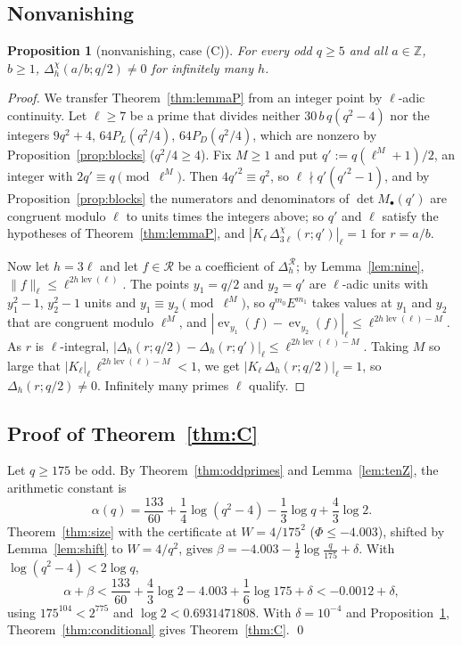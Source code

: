 \documentclass[11pt]{amsart}
\newtheorem{proposition}[theorem]{Proposition}
\theoremstyle{definition}
\theoremstyle{remark}
\numberwithin{equation}{section}
\newcommand{\ZZ}{\mathbb{Z}}
\newcommand{\cR}{\mathcal{R}}
\newcommand{\lev}{\operatorname{lev}}
\newcommand{\ev}{\operatorname{ev}}
\begin{document}
\subsection{Nonvanishing}

\begin{proposition}[nonvanishing, case (C)]\label{prop:nonvanC}
For every odd $q\ge5$ and all $a\in\ZZ$, $b\ge1$, $\Delta^\chi_h(a/b;q/2)\ne0$ for infinitely many $h$.
\end{proposition}

\begin{proof}
We transfer Theorem~\ref{thm:lemmaP} from an integer point by $\ell$-adic continuity. Let $\ell\ge7$ be a prime that divides
neither $30\,b\,q(q^2-4)$ nor the integers $9q^2+4$, $64P_L(q^2/4)$, $64P_D(q^2/4)$, which are nonzero by
Proposition~\ref{prop:blocks} ($q^2/4\ge4$). Fix $M\ge1$ and put $q':=q(\ell^M+1)/2$, an integer with $2q'\equiv q\pmod{\ell^M}$.
Then $4q'^2\equiv q^2$, so $\ell\nmid q'(q'^2-1)$, and by Proposition~\ref{prop:blocks} the numerators and denominators of
$\det M_\bullet(q')$ are congruent modulo $\ell$ to units times the integers above; so $q'$ and $\ell$ satisfy the
hypotheses of Theorem~\ref{thm:lemmaP}, and $|K_\ell\,\Delta^\chi_{3\ell}(r;q')|_\ell=1$ for $r=a/b$.

Now let $h=3\ell$ and let $f\in\cR$ be a coefficient of $\Delta^{\cR}_h$; by Lemma~\ref{lem:nine}, $\|f\|_\ell\le\ell^{2h\lev(\ell)}$.
The points $y_1=q/2$ and $y_2=q'$ are $\ell$-adic units with $y_1^2-1$, $y_2^2-1$ units and $y_1\equiv y_2\pmod{\ell^M}$,
so $q^{m_0}E^{m_1}$ takes values at $y_1$ and $y_2$ that are congruent modulo $\ell^M$, and
$|\ev_{y_1}(f)-\ev_{y_2}(f)|_\ell\le\ell^{2h\lev(\ell)-M}$. As $r$ is $\ell$-integral,
$|\Delta_h(r;q/2)-\Delta_h(r;q')|_\ell\le\ell^{2h\lev(\ell)-M}$. Taking $M$ so large that $|K_\ell|_\ell\,\ell^{2h\lev(\ell)-M}<1$,
we get $|K_\ell\,\Delta_h(r;q/2)|_\ell=1$, so $\Delta_h(r;q/2)\ne0$. Infinitely many primes $\ell$ qualify.
\end{proof}

\subsection{Proof of Theorem~\ref{thm:C}}
Let $q\ge175$ be odd. By Theorem~\ref{thm:oddprimes} and Lemma~\ref{lem:tenZ}, the arithmetic constant is
\[
  \alpha(q)=\frac{133}{60}+\frac14\log(q^2-4)-\frac13\log q+\frac43\log2 .
\]
Theorem~\ref{thm:size} with the certificate at $W=4/175^2$ ($\Phi\le-4.003$), shifted by Lemma~\ref{lem:shift} to $W=4/q^2$,
gives $\beta=-4.003-\frac12\log\frac q{175}+\delta$. With $\log(q^2-4)<2\log q$,
\[
  \alpha+\beta<\frac{133}{60}+\frac43\log2-4.003+\frac16\log175+\delta<-0.0012+\delta ,
\]
using $175^{104}<2^{775}$ and $\log2<0.6931471808$. With $\delta=10^{-4}$ and Proposition~\ref{prop:nonvanC},
Theorem~\ref{thm:conditional} gives Theorem~\ref{thm:C}. \qed
\end{document}
